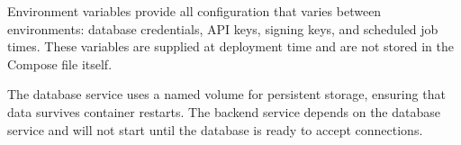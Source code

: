 Environment variables provide all configuration that varies between environments: database credentials, API keys, signing keys, and scheduled job times. These variables are supplied at deployment time and are not stored in the Compose file itself.

The database service uses a named volume for persistent storage, ensuring that data survives container restarts. The backend service depends on the database service and will not start until the database is ready to accept connections.

